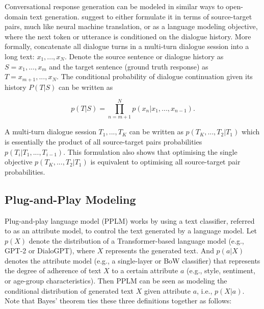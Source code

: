 Conversational response generation can be modeled in similar ways to open-domain text generation. \cite{zeng-etal-2020-meddialog} suggest to either formulate it in terms of source-target pairs, much like neural machine translation, or as a language modeling objective, where the next token or utterance is conditioned on the dialogue history. 
More formally, concatenate all dialogue turns in a multi-turn dialogue session into a long text: $x_1, ..., x_N$. Denote the source sentence or dialogue history as $S = x_1, ..., x_m$ and the target sentence (ground truth response) as $T = x_{m + 1}, ..., x_N$. The conditional probability of dialogue continuation given its history $P(T | S)$ can be written as

\begin{equation}
    p(T | S) = \prod_{n = m + 1}^N p(x_n | x_1, ..., x_{n - 1}).
\end{equation}

A multi-turn dialogue session $T_1, ..., T_K$ can be written as $p(T_K, ..., T_2 | T_1)$ which is essentially the product of all source-target pairs probabilities $p(T_i | T_1, ..., T_{i - 1})$. This formulation also shows that optimising the single objective $p(T_K, ..., T_2 | T_1)$ is equivalent to optimising all source-target pair probabilities.


\subsection{Plug-and-Play Modeling}
\label{sec:ppm}

Plug-and-play language model (PPLM) \cite{dathathri2019plug} works by using a text classifier, referred to as an attribute model, to control the text generated by a language model. Let $p(X)$ denote the distribution of a Transformer-based language model (e.g., GPT-2 or DialoGPT), where $X$ represents the generated text. And $p(a | X)$ denotes the attribute model (e.g., a single-layer or BoW classifier) that represents the degree of adherence of text $X$ to a certain attribute $a$ (e.g., style, sentiment, or age-group characteristics). Then PPLM can be seen as modeling the conditional distribution of generated text $X$ given attribute $a$, i.e., $p(X | a)$. Note that Bayes' theorem ties these three definitions together as follows:

